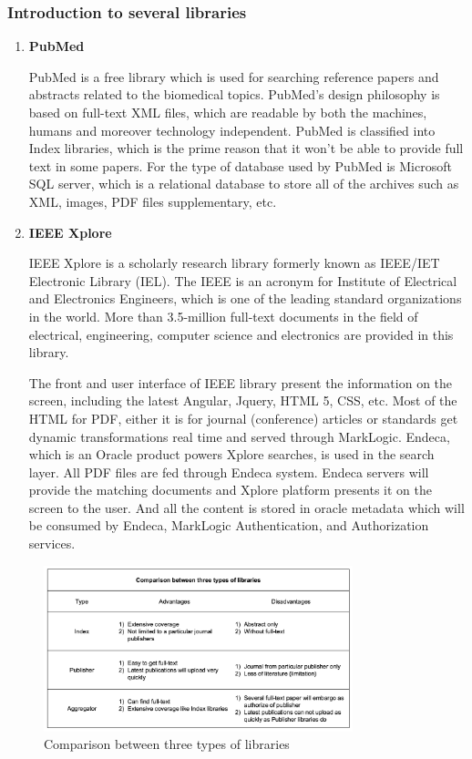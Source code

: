 \subsubsection{Introduction to several libraries }
\begin{enumerate}
	\item\textbf{PubMed}
	\setlength{\parindent}{1em}
		
	 PubMed is a free library which is used for searching reference papers and abstracts related to the biomedical topics. PubMed’s design philosophy is based on full-text XML files, which are readable by both the machines, humans and moreover technology independent. PubMed is classified into Index libraries, which is the prime reason that it won’t be able to provide full text in some papers. For the type of database used by PubMed is Microsoft SQL server, which is a relational database to store all of the archives such as XML, images, PDF files supplementary, etc.
	
	
	\item\textbf{IEEE Xplore}
	\setlength{\parindent}{1em}
	
	IEEE Xplore is a scholarly research library formerly known as IEEE/IET Electronic Library (IEL). The IEEE is an acronym for Institute of Electrical and Electronics Engineers, which is one of the leading standard organizations in the world. More than 3.5-million full-text documents in the field of electrical, engineering, computer science and electronics are provided in this library. 
	
	The front and user interface of IEEE library present the information on the screen, including the latest Angular, Jquery, HTML 5, CSS, etc. Most of the HTML for PDF, either it is for journal (conference) articles or standards get dynamic transformations real time and served through MarkLogic. Endeca, which is an Oracle product powers Xplore searches, is used in the search layer. All PDF files are fed through Endeca system. Endeca servers will provide the matching documents and Xplore platform presents it on the screen to the user. And all the content is stored in oracle metadata which will be consumed by Endeca, MarkLogic Authentication, and Authorization services.
	
\end{enumerate}

\begin{figure}[htb]
	\begin{center}
		\includegraphics[width=0.8\textwidth]{Wolverine_Background_Chart_1}
	\end{center}
	\caption{Comparison between three types of libraries}
\end{figure}
\newpage
